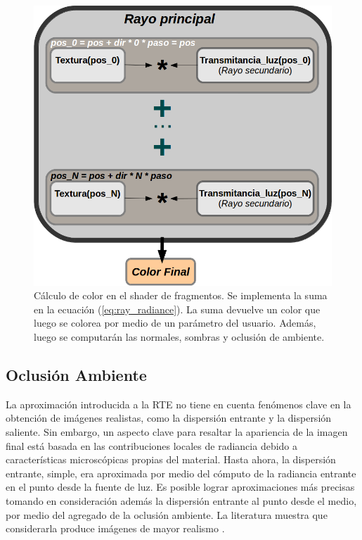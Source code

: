 \begin{figure}[htb!]
\centerline{\includegraphics[width=12cm]{fragmentshader}}
\caption[Cálculo de color en el shader de fragmentos]{Cálculo de color en el shader de fragmentos. Se implementa la suma en la ecuación (\ref{eq:ray_radiance}). La suma devuelve un color que luego se colorea por medio de un parámetro del usuario. Además, luego se computarán las normales, sombras y oclusión de ambiente.}
\label{fg:fragmentshaderrte}
\end{figure}


\subsection{Oclusión Ambiente}

La aproximación introducida a la RTE no tiene en cuenta fenómenos clave en la obtención de imágenes realistas, como la dispersión entrante y la dispersión saliente.
Sin embargo, un aspecto clave para resaltar la apariencia de la imagen final está basada en las contribuciones locales de radiancia debido a características microscópicas propias del material.
Hasta ahora, la dispersión entrante, simple, era aproximada por medio del cómputo de la radiancia entrante en el punto desde la fuente de luz.
Es posible lograr aproximaciones más precisas tomando en consideración además la dispersión entrante al punto desde el medio, por medio del agregado de la oclusión ambiente.
La literatura muestra que considerarla produce imágenes de mayor realismo \cite{Hernell2010}.


